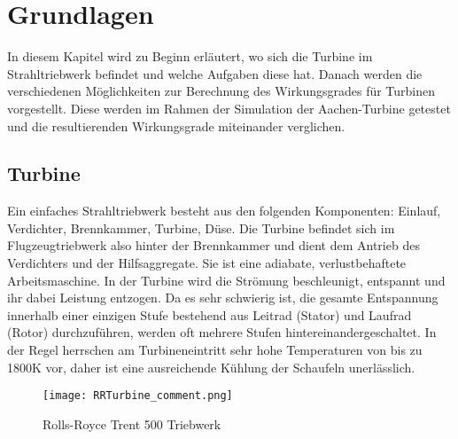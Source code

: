\chapter{Grundlagen}
In diesem Kapitel wird zu Beginn erläutert, wo sich die Turbine im Strahltriebwerk befindet und welche Aufgaben diese hat. Danach werden die verschiedenen Möglichkeiten zur Berechnung des Wirkungsgrades für Turbinen vorgestellt. Diese werden im Rahmen der Simulation der Aachen-Turbine getestet und die resultierenden Wirkungsgrade miteinander verglichen.

\section{Turbine}
Ein einfaches Strahltriebwerk besteht aus den folgenden Komponenten: Einlauf, Verdichter, Brennkammer, Turbine, Düse. Die Turbine befindet sich im Flugzeugtriebwerk also hinter der Brennkammer und dient dem Antrieb des Verdichters und der Hilfsaggregate. Sie ist eine adiabate, verlustbehaftete Arbeitsmaschine. In der Turbine wird die Strömung beschleunigt, entspannt und ihr dabei Leistung entzogen. Da es sehr schwierig ist, die gesamte Entspannung innerhalb einer einzigen Stufe bestehend aus Leitrad (Stator) und Laufrad (Rotor) durchzuführen, werden oft mehrere Stufen hintereinandergeschaltet. In der Regel herrschen am Turbineneintritt sehr hohe Temperaturen von bis zu 1800K vor, daher ist eine ausreichende Kühlung der Schaufeln unerlässlich.\cite{GLR-Skript}


\begin{figure}[htbp]
	\centering
	\texttt{[image: RRTurbine\_comment.png]}
	\caption{Rolls-Royce Trent 500 Triebwerk \cite{RRFlickr}} \label{fig:RRTurbine}
\end{figure} 


